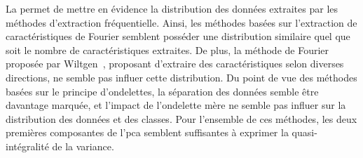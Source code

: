 La  permet de mettre en évidence la distribution des données extraites par les méthodes d'extraction fréquentielle. Ainsi, les méthodes basées sur l'extraction de caractéristiques de Fourier semblent posséder une distribution similaire quel que soit le nombre de caractéristiques extraites. De plus, la méthode de Fourier proposée par Wiltgen~\cite{Wiltgen2008}, proposant d'extraire des caractéristiques selon diverses directions, ne semble pas influer cette distribution. Du point de vue des méthodes basées sur le principe d'ondelettes, la séparation des données semble être davantage marquée, et l'impact de l'ondelette mère ne semble pas influer sur la distribution des données et des classes. Pour l'ensemble de ces méthodes, les deux premières composantes de l'\gls{pca} semblent suffisantes à exprimer la quasi-intégralité de la variance.\par

